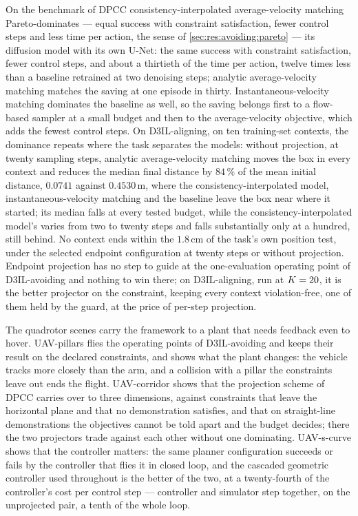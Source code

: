On the benchmark of \ac{DPCC} consistency-interpolated average-velocity matching Pareto-dominates --- equal success with constraint satisfaction, fewer control steps and less time per action, the
sense of \autoref{sec:res:avoiding:pareto} --- its
diffusion model with its own U-Net: the same success with constraint satisfaction, fewer control
steps, and about a thirtieth of the time per action, twelve times less than a baseline retrained at
two denoising steps; analytic average-velocity matching matches the saving at one episode in thirty.
Instantaneous-velocity matching dominates the baseline as well, so the saving belongs first to a
flow-based sampler at a small budget and then to the average-velocity objective, which adds the fewest
control steps. On D3IL-aligning, on ten training-set contexts, the dominance repeats where the task separates the models: without projection, at
twenty sampling steps, analytic average-velocity matching moves the box in
every context and reduces the median final distance by $84\,\%$ of the mean initial distance,
$0.0741$ against $0.4530$\,m, where the consistency-interpolated model, instantaneous-velocity
matching and the baseline leave the box near where it started; its median falls at every tested
budget, while the consistency-interpolated model's varies from two to twenty steps and falls
substantially only at a hundred, still behind. No context ends within the $1.8$\,cm of the task's own
position test, under the selected endpoint configuration at twenty steps or without projection.
Endpoint projection has no step to guide at the one-evaluation operating point of D3IL-avoiding and
nothing to win there; on D3IL-aligning, run at $K = 20$, it is the better projector on the
constraint, keeping every context violation-free, one of them held by the guard, at the price of per-step projection.

The quadrotor scenes carry the framework to a plant that needs feedback even to hover. UAV-pillars flies
the operating points of D3IL-avoiding and keeps their result on the declared constraints, and shows
what the plant changes: the vehicle tracks more closely than the arm, and a collision with a pillar the
constraints leave out ends the flight. UAV-corridor shows that the projection scheme of \ac{DPCC}
carries over to three dimensions, against constraints that leave the horizontal plane and that no
demonstration satisfies, and that on straight-line demonstrations the objectives cannot be told
apart and the budget decides; there the two projectors trade against each other without one dominating.
UAV-s-curve shows that the controller matters: the same planner configuration succeeds or fails by
the controller that flies it in closed loop, and the cascaded geometric controller used throughout is
the better of the two, at a twenty-fourth of the controller's cost per control step --- controller
and simulator step together, on the unprojected pair, a tenth of the whole loop.

